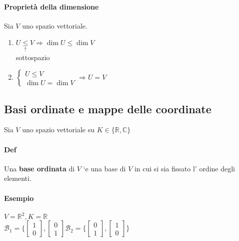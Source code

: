 \paragraph{Proprietà della dimensione} Sia $V$ uno spazio vettoriale.
\begin{enumerate}
    \item $U\underset{\uparrow}{\leq} V\Longrightarrow \dim U\leq \dim{V}$\\
        sottospazio\\
    \item 
        $
        \begin{cases}
            U\leq V\\
            \dim U =\dim V
        \end{cases}
        \Longrightarrow U=V
        $
\end{enumerate}


\subsection{Basi ordinate e mappe delle coordinate}
Sia $V$ uno spazio vettoriale su $K\in\{\mathbb{R}, \mathbb{C}\}$
\paragraph{Def} Una \textbf{base ordinata} di $V$ `e una base di $V$ in cui si sia fissato l' ordine degli elementi. 
\paragraph{Esempio} $V= \mathbb{R}^2, K=\mathbb{R}$\\
$
\mathcal{B}_1= \{ 
    \begin{bmatrix}
        1\\0
    \end{bmatrix}
    ,
    \begin{bmatrix}
        0\\1
    \end{bmatrix}
\mathcal{B}_2= \{ 
    \begin{bmatrix}
        0\\1
    \end{bmatrix}
    ,
    \begin{bmatrix}
        1\\0
    \end{bmatrix}
\}$

